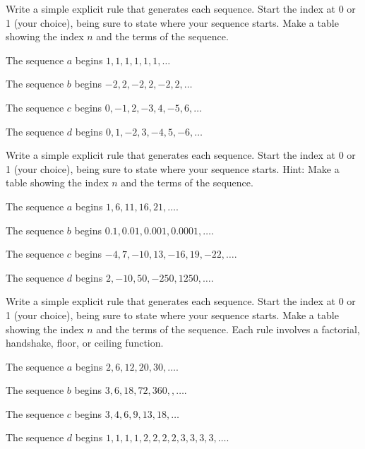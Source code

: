 \begin{exer}[\exerP] %
\label{exer_NTE_constants_alt}
    Write a simple explicit rule that generates each sequence.  Start the index at 0 or 1 (your choice), being sure to state where your sequence starts. Make a table showing the index $n$ and the terms of the sequence.  
        \begin{exerpart}
            \item The sequence $a$ begins $1, 1, 1, 1, 1, 1, \ldots$
            \item The sequence $b$ begins $-2, 2, -2, 2, -2, 2, \ldots$
            \item The sequence $c$ begins $0,-1,2,-3,4,-5,6, \ldots$
            \item The sequence $d$ begins $0,1,-2,3,-4,5,-6, \ldots$
        \end{exerpart}
\end{exer}

\begin{exer}[\exerP] %
\label{exer_NTE_lin_exp} 
    Write a simple explicit rule that generates each sequence.  Start the index at 0 or 1 (your choice), being sure to state where your sequence starts. Hint: Make a table showing the index $n$ and the terms of the sequence.  
        \begin{exerpart}
            \item The sequence $a$ begins $1, 6, 11, 16, 21,  \ldots$. %
            \item The sequence $b$ begins $0.1, 0.01, 0.001, 0.0001,   \ldots$. %
            \item The sequence $c$ begins $-4, 7, -10, 13, -16, 19, -22,  \ldots$. %
            \item The sequence $d$ begins $2, -10, 50, -250, 1250,   \ldots$. %
        \end{exerpart}
\end{exer}

\begin{exer}[\exerU] %
\label{exer_NTE_complicated} 
    Write a simple explicit rule that generates each sequence.  Start the index at 0 or 1 (your choice), being sure to state where your sequence starts.  Make a table showing the index $n$ and the terms of the sequence. Each rule involves a factorial, handshake, floor, or ceiling function. 
        \begin{exerpart}
            \item The sequence $a$ begins $2,6,12,20,30,  \ldots$. %
            \item The sequence $b$ begins $3, 6, 18, 72, 360, ,  \ldots$. %
            \item The sequence $c$ begins $3, 4, 6, 9, 13, 18, \ldots$  %
            \item The sequence $d$ begins $1,1,1,1,2,2,2,2,3,3,3,3, \ldots$. %
        \end{exerpart}
\end{exer}

